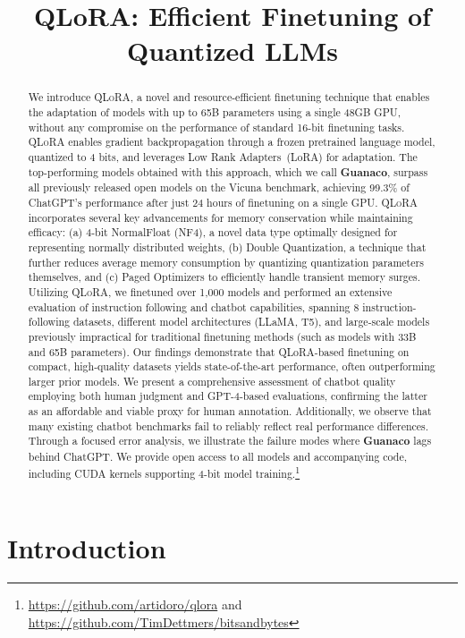 \title{QLoRA: Efficient Finetuning of Quantized LLMs}

\begin{abstract}
We introduce \textsc{QLoRA}, a novel and resource-efficient finetuning technique that enables the adaptation of models with up to 65B parameters using a single 48GB GPU, without any compromise on the performance of standard 16-bit finetuning tasks. \textsc{QLoRA} enables gradient backpropagation through a frozen pretrained language model, quantized to 4 bits, and leverages Low Rank Adapters~(LoRA) for adaptation. The top-performing models obtained with this approach, which we call \textbf{Guanaco}, surpass all previously released open models on the Vicuna benchmark, achieving 99.3\% of ChatGPT's performance after just 24 hours of finetuning on a single GPU. \textsc{QLoRA} incorporates several key advancements for memory conservation while maintaining efficacy: (a) 4-bit NormalFloat (NF4), a novel data type optimally designed for representing normally distributed weights, (b) Double Quantization, a technique that further reduces average memory consumption by quantizing quantization parameters themselves, and (c) Paged Optimizers to efficiently handle transient memory surges. Utilizing \textsc{QLoRA}, we finetuned over 1,000 models and performed an extensive evaluation of instruction following and chatbot capabilities, spanning 8 instruction-following datasets, different model architectures (LLaMA, T5), and large-scale models previously impractical for traditional finetuning methods (such as models with 33B and 65B parameters). Our findings demonstrate that QLoRA-based finetuning on compact, high-quality datasets yields state-of-the-art performance, often outperforming larger prior models. We present a comprehensive assessment of chatbot quality employing both human judgment and GPT-4-based evaluations, confirming the latter as an affordable and viable proxy for human annotation. Additionally, we observe that many existing chatbot benchmarks fail to reliably reflect real performance differences. Through a focused error analysis, we illustrate the failure modes where \textbf{Guanaco} lags behind ChatGPT. We provide open access to all models and accompanying code, including CUDA kernels supporting 4-bit model training.\footnote{\url{https://github.com/artidoro/qlora} and \url{https://github.com/TimDettmers/bitsandbytes}}
\end{abstract}

\section{Introduction}

